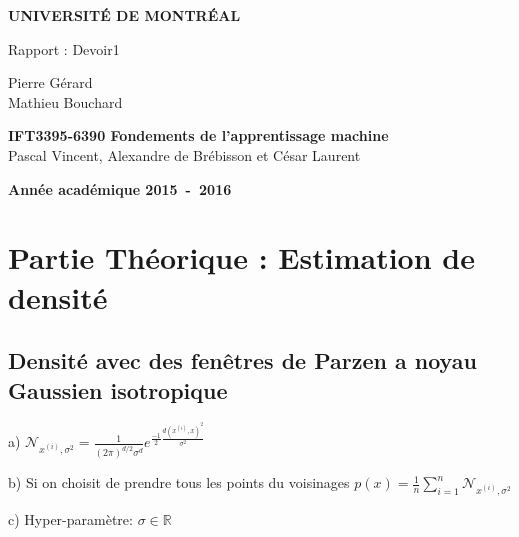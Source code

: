 \documentclass[a4paper,10pt]{article}
\begin{document}
\begin{titlepage}
\begin{center}
\textbf{\textsc{UNIVERSIT\'E DE MONTR\'EAL}}\\
\vfill{}\vfill{}
\begin{center}{\Huge Rapport : Devoir1 }\end{center}{\Huge \par}
\begin{center}{\large Pierre Gérard \\ Mathieu Bouchard}\end{center}{\Huge \par}
\vfill{}\vfill{} \vfill{}
\begin{center}{\large \textbf{IFT3395-6390 Fondements de l'apprentissage machine}}\hfill{\\Pascal Vincent, Alexandre de Brébisson et César Laurent}\end{center}{\large\par}
\vfill{}\vfill{}\enlargethispage{3cm}
\textbf{Année académique 2015~-~2016}
\end{center}
\end{titlepage}



\tableofcontents

\pagebreak

\section{Partie Théorique : Estimation de densité}

\subsection{Densité avec des fenêtres de Parzen a noyau Gaussien isotropique}

a) $\mathcal{N}_{x^{(i)}, \sigma^{2}} = \frac{1}{(2 \pi)^{d/2} \sigma^{d}} e^{ \frac{-1}{2} \frac{d(x^{(i)},x)^{2}}{\sigma^{2}} } $



b) Si on choisit de prendre tous les points du voisinages
$ p(x) =  \frac{1}{n} \sum_{i=1}^{n} \mathcal{N}_{x^{(i)}, \sigma^{2}} $

c) Hyper-paramètre: $\sigma \in \mathds{R}$
\end{document}
